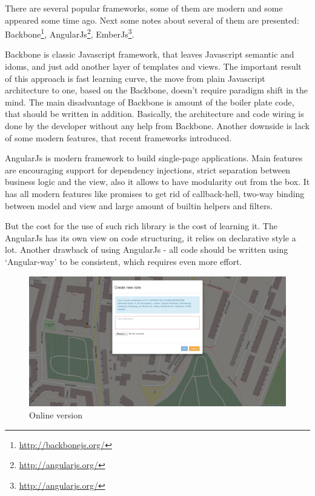\documentclass[12pt,a4paper]{article}
\begin{document}
There are several popular frameworks, some of them are modern and some appeared
some time ago. Next some notes about several of them are presented:
Backbone\footnote{\url{http://backbonejs.org/}},
AngularJs\footnote{\url{http://angularjs.org/}},
EmberJs\footnote{\url{http://angularjs.org/}}.

Backbone is classic Javascript framework, that leaves Javascript semantic and idoms,
and just add another layer of templates and views. The important result of
this approach is fast learning curve, the move from plain Javascript architecture to
one, based on the Backbone, doesn't require paradigm shift in the mind.
The main disadvantage of Backbone is amount of the boiler plate code, that should
be written in addition. Basically, the architecture and code wiring is done by
the developer without any help from Backbone. Another downside is lack of some
modern features, that recent frameworks introduced.

AngularJs is modern framework to build single-page applications. Main features
are encouraging support for dependency injections, strict separation between
business logic and the view, also it allows to have modularity out from the box.
It has all modern features like promises to get rid of callback-hell, two-way
binding between model and view and large amount of builtin helpers and filters.

But the cost for the use of such rich library is the cost of learning it.
The AngularJs has its own view on code structuring, it relies on declarative
style a lot. Another drawback of using AngularJs - all code should be written
using `Angular-way' to be consistent, which requires even more effort.

    \begin{figure}[h]
      \begin{center}
        \includegraphics[width=\textwidth]{res/online}
      \end{center}
      \caption{Online version}
    \end{figure}
\end{document}
